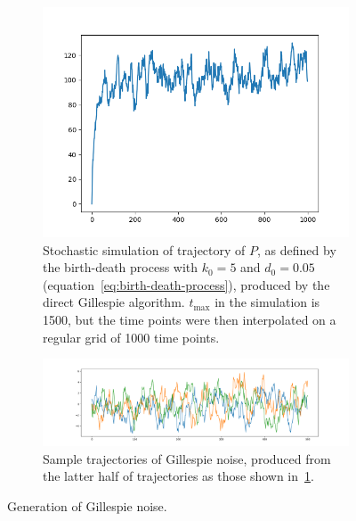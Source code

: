 \begin{figure}
  \centering
  \begin{subfigure}{0.9\textwidth}
    \centering
    \includegraphics[width=\linewidth]{gillespie}
    \caption{
      Stochastic simulation of trajectory of $P$, as defined by the birth-death process with $k_{0} = 5$ and $d_{0} = 0.05$ (equation~\ref{eq:birth-death-process}), produced by the direct Gillespie algorithm.
      $t_{\mathrm{max}}$ in the simulation is \num{1500}, but the time points were then interpolated on a regular grid of \num{1000} time points.
    }
    \label{fig:gillespie_trajectory}
  \end{subfigure}

 \begin{subfigure}{0.9\textwidth}
    \centering
    \includegraphics[width=\linewidth]{gillespie_noise_samples}
    \caption{
      Sample trajectories of Gillespie noise, produced from the latter half of trajectories as those shown in~\ref{fig:gillespie_trajectory}.
    }
    \label{fig:gillespie_noise_samples}
  \end{subfigure}

  \caption{Generation of Gillespie noise.}
  \label{fig:gillespie_noise}
\end{figure}

